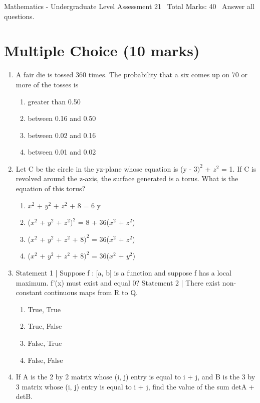 \documentclass[12pt]{article}
\begin{document}
\begin{center}
Mathematics - Undergraduate Level Assessment 21 \
Total Marks: 40 \
Answer all questions.
\end{center}

\section*{Multiple Choice (10 marks)}
\begin{enumerate}[label=\arabic*.]
\item A fair die is tossed 360 times. The probability that a six comes up on 70 or more of the tosses is
\begin{enumerate}[label=(\alph*)]
    \item greater than 0.50
    \item between 0.16 and 0.50
    \item between 0.02 and 0.16
    \item between 0.01 and 0.02
\end{enumerate}
\item Let C be the circle in the yz-plane whose equation is (y - $3)^2$ + $z^2$ = 1. If C is revolved around the z-axis, the surface generated is a torus. What is the equation of this torus?
\begin{enumerate}[label=(\alph*)]
    \item $x^2$ + $y^2$ + $z^2$ + 8 = 6 y
    \item ($x^2$ + $y^2$ + $z^2$$)^2$ = 8 + 36($x^2$ + $z^2$)
    \item ($x^2$ + $y^2$ + $z^2$ + $8)^2$ = 36($x^2$ + $z^2$)
    \item ($x^2$ + $y^2$ + $z^2$ + $8)^2$ = 36($x^2$ + $y^2$)
\end{enumerate}
\item Statement 1 | Suppose f : [a, b] is a function and suppose f has a local maximum. f'(x) must exist and equal 0? Statement 2 | There exist non-constant continuous maps from R to Q.
\begin{enumerate}[label=(\alph*)]
    \item True, True
    \item True, False
    \item False, True
    \item False, False
\end{enumerate}
\item If A is the 2 by 2 matrix whose (i, j) entry is equal to i + j, and B is the 3 by 3 matrix whose (i, j) entry is equal to i + j, find the value of the sum detA + detB.

\end{enumerate}
\end{document}
